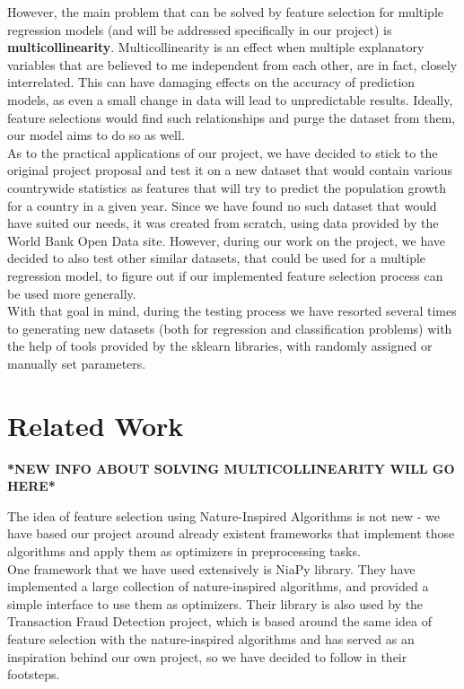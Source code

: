 \documentclass[conference]{IEEEtran}
\begin{document}
However, the main problem that can be solved by feature selection for multiple regression models (and will be addressed specifically in our project) is \textbf{multicollinearity}. Multicollinearity is an effect when multiple explanatory variables that are believed to me independent from each other, are in fact, closely interrelated. This can have damaging effects on the accuracy of prediction models, as even a small change in data will lead to unpredictable results. Ideally, feature selections would find such relationships and purge the dataset from them, our model aims to do so as well.\\

As to the practical applications of our project, we have decided to stick to the original project proposal and test it on a new dataset that would contain various countrywide statistics as features that will try to predict the population growth for a country in a given year. Since we have found no such dataset that would have suited our needs, it was created from scratch, using data provided by the World Bank Open Data site\cite{world_bank_moment}. However, during our work on the project, we have decided to also test other similar datasets, that could be used for a multiple regression model, to figure out if our implemented feature selection process can be used more generally.\\

With that goal in mind, during the testing process we have resorted several times to generating new datasets (both for regression and classification problems) with the help of tools provided by the sklearn libraries, with randomly assigned or manually set parameters.

\section{Related Work}

\textbf{*NEW INFO ABOUT SOLVING MULTICOLLINEARITY WILL GO HERE*}

The idea of feature selection using Nature-Inspired Algorithms is not new - we have based our project around already existent frameworks that implement those algorithms and apply them as optimizers in preprocessing tasks.\\

One framework that we have used extensively is NiaPy library\cite{niapy}. They have implemented a large collection of nature-inspired algorithms, and provided a simple interface to use them as optimizers. Their library is also used by the Transaction Fraud Detection project, which is based around the same idea of feature selection with the nature-inspired algorithms and has served as an inspiration behind our own project, so we have decided to follow in their footsteps.\\
\end{document}
